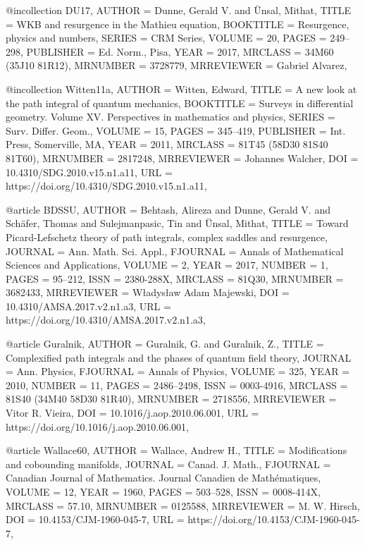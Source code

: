 @incollection {DU17,
    AUTHOR = {Dunne, Gerald V. and \"{U}nsal, Mithat},
     TITLE = {W{KB} and resurgence in the {M}athieu equation},
 BOOKTITLE = {Resurgence, physics and numbers},
    SERIES = {CRM Series},
    VOLUME = {20},
     PAGES = {249--298},
 PUBLISHER = {Ed. Norm., Pisa},
      YEAR = {2017},
   MRCLASS = {34M60 (35J10 81R12)},
  MRNUMBER = {3728779},
MRREVIEWER = {Gabriel Alvarez},
}

@incollection {Witten11a,
    AUTHOR = {Witten, Edward},
     TITLE = {A new look at the path integral of quantum mechanics},
 BOOKTITLE = {Surveys in differential geometry. {V}olume {XV}.
              {P}erspectives in mathematics and physics},
    SERIES = {Surv. Differ. Geom.},
    VOLUME = {15},
     PAGES = {345--419},
 PUBLISHER = {Int. Press, Somerville, MA},
      YEAR = {2011},
   MRCLASS = {81T45 (58D30 81S40 81T60)},
  MRNUMBER = {2817248},
MRREVIEWER = {Johannes Walcher},
       DOI = {10.4310/SDG.2010.v15.n1.a11},
       URL = {https://doi.org/10.4310/SDG.2010.v15.n1.a11},
}

@article {BDSSU,
    AUTHOR = {Behtash, Alireza and Dunne, Gerald V. and Sch\"{a}fer, Thomas and
              Sulejmanpasic, Tin and \"{U}nsal, Mithat},
     TITLE = {Toward {P}icard-{L}efschetz theory of path integrals, complex
              saddles and resurgence},
   JOURNAL = {Ann. Math. Sci. Appl.},
  FJOURNAL = {Annals of Mathematical Sciences and Applications},
    VOLUME = {2},
      YEAR = {2017},
    NUMBER = {1},
     PAGES = {95--212},
      ISSN = {2380-288X},
   MRCLASS = {81Q30},
  MRNUMBER = {3682433},
MRREVIEWER = {W\l adys\l aw Adam Majewski},
       DOI = {10.4310/AMSA.2017.v2.n1.a3},
       URL = {https://doi.org/10.4310/AMSA.2017.v2.n1.a3},
}

@article {Guralnik,
    AUTHOR = {Guralnik, G. and Guralnik, Z.},
     TITLE = {Complexified path integrals and the phases of quantum field
              theory},
   JOURNAL = {Ann. Physics},
  FJOURNAL = {Annals of Physics},
    VOLUME = {325},
      YEAR = {2010},
    NUMBER = {11},
     PAGES = {2486--2498},
      ISSN = {0003-4916},
   MRCLASS = {81S40 (34M40 58D30 81R40)},
  MRNUMBER = {2718556},
MRREVIEWER = {Vitor R. Vieira},
       DOI = {10.1016/j.aop.2010.06.001},
       URL = {https://doi.org/10.1016/j.aop.2010.06.001},
}

@article {Wallace60,
    AUTHOR = {Wallace, Andrew H.},
     TITLE = {Modifications and cobounding manifolds},
   JOURNAL = {Canad. J. Math.},
  FJOURNAL = {Canadian Journal of Mathematics. Journal Canadien de
              Math\'{e}matiques},
    VOLUME = {12},
      YEAR = {1960},
     PAGES = {503--528},
      ISSN = {0008-414X},
   MRCLASS = {57.10},
  MRNUMBER = {0125588},
MRREVIEWER = {M. W. Hirsch},
       DOI = {10.4153/CJM-1960-045-7},
       URL = {https://doi.org/10.4153/CJM-1960-045-7},
}

